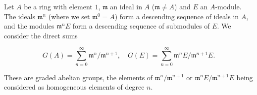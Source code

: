 Let $A$ be a ring with element $1$, $\mathfrak{m}$ an ideal in $A$ ($\mathfrak{m} \neq A$) and $E$ an $A$-module. The ideals $\mathfrak{m}^n$ (where we set $\mathfrak{m}^0 = A$) form a descending sequence of ideals in $A$, and the modules $\mathfrak{m}^n E$ form a descending sequence of submodules of $E$. We consider the direct sums

$$G(A) = \sum_{n=0}^{\infty} \mathfrak{m}^n / \mathfrak{m}^{n+1}, \quad G(E) = \sum_{n=0}^{\infty} \mathfrak{m}^n E / \mathfrak{m}^{n+1} E.$$

These are graded abelian groups, the elements of $\mathfrak{m}^n / \mathfrak{m}^{n+1}$ or $\mathfrak{m}^n E / \mathfrak{m}^{n+1} E$ being considered as homogeneous elements of degree $n$.